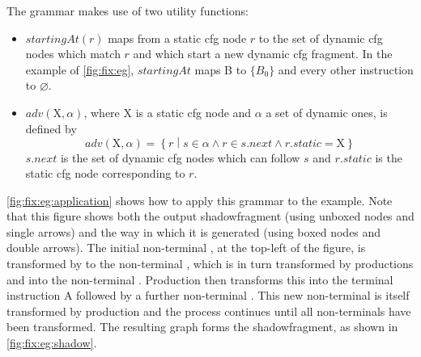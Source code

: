 The grammar makes use of two utility functions:
\begin{itemize}
\item $\mathit{startingAt}(r)$ maps from a \gls{static cfg} node $r$
  to the set of \gls{dynamic cfg} nodes which match $r$ and which
  start a new \gls{dynamic cfg} fragment.  In the example of
  \autoref{fig:fix:eg}, $\mathit{startingAt}$ maps B to $\{B_0\}$ and
  every other instruction to $\varnothing$.
\item $\mathit{adv}(\mathrm{X}, \alpha)$, where $\mathrm{X}$ is a
  \gls{static cfg} node and $\alpha$ a set of dynamic ones, is defined
  by
  \begin{displaymath}
    \mathit{adv}(\mathrm{X}, \alpha) = \left\{r \middle| s \in \alpha \wedge r \in s.\mathit{next} \wedge r.\mathit{static} = \mathrm{X}\right\}
  \end{displaymath}
  $s.\mathit{next}$ is the set of \gls{dynamic cfg} nodes which can
  follow $s$ and $r.\mathit{static}$ is the \gls{static cfg} node
  corresponding to $r$.
\end{itemize}

\noindent
\autoref{fig:fix:eg:application} shows how to apply this grammar to
the example.  Note that this figure shows both the output
\gls{shadowfragment} (using unboxed nodes and single arrows) and the
way in which it is generated (using boxed nodes and double arrows).
The initial non-terminal , at the top-left of the figure, is
transformed by  to the non-terminal , which is in turn
transformed by productions  and  into
the non-terminal .  Production  then transforms this
into the terminal instruction A followed by a further non-terminal
.  This
new non-terminal is itself transformed by production 
and the process continues until all non-terminals have been
transformed.  The resulting graph forms the \gls{shadowfragment}, as
shown in \autoref{fig:fix:eg:shadow}.

